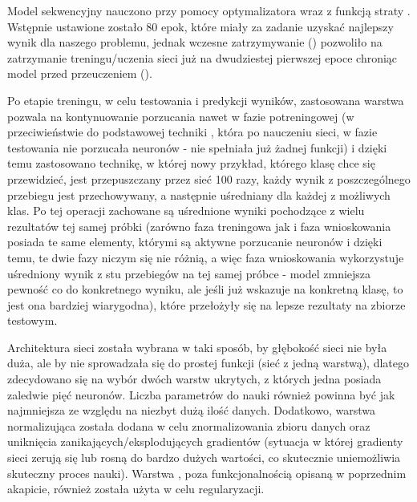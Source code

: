         Model sekwencyjny nauczono przy pomocy optymalizatora  \cite{adam} \cite{nadam} wraz z funkcją straty . Wstępnie ustawione zostało 80 epok, które miały za zadanie uzyskać najlepszy wynik dla naszego problemu, jednak wczesne zatrzymywanie () pozwoliło na zatrzymanie treningu/uczenia sieci już na dwudziestej pierwszej epoce chroniąc model przed przeuczeniem ().
        
        Po etapie treningu, w celu testowania i predykcji wyników, zastosowana warstwa  pozwala na kontynuowanie porzucania nawet w fazie potreningowej (w przeciwieństwie do podstawowej techniki , która po nauczeniu sieci, w fazie testowania nie porzucała neuronów - nie spełniała już żadnej funkcji) i dzięki temu zastosowano technikę, w której nowy przykład, którego klasę chce się przewidzieć, jest przepuszczany przez sieć 100 razy, każdy wynik z poszczególnego przebiegu jest przechowywany, a następnie uśredniany dla każdej z możliwych klas. Po tej operacji zachowane są uśrednione wyniki pochodzące z wielu rezultatów tej samej próbki (zarówno faza treningowa jak i faza wnioskowania posiada te same elementy, którymi są aktywne porzucanie neuronów i dzięki temu, te dwie fazy niczym się nie różnią, a więc faza wnioskowania wykorzystuje uśredniony wynik z stu przebiegów na tej samej próbce - model zmniejsza pewność co do konkretnego wyniku, ale jeśli już wskazuje na konkretną klasę, to jest ona bardziej wiarygodna), które przełożyły się na lepsze rezultaty na zbiorze testowym. 
        
        Architektura sieci została wybrana w taki sposób, by głębokość sieci nie była duża, ale by nie sprowadzała się do prostej funkcji (sieć z jedną warstwą), dlatego zdecydowano się na wybór dwóch warstw ukrytych, z których jedna posiada zaledwie pięć neuronów. Liczba parametrów do nauki również powinna być jak najmniejsza ze względu na niezbyt dużą ilość danych. Dodatkowo, warstwa normalizująca została dodana w celu znormalizowania zbioru danych oraz uniknięcia zanikających/eksplodujących gradientów (sytuacja w której gradienty sieci zerują się lub rosną do bardzo dużych wartości, co skutecznie uniemożliwia skuteczny proces nauki). Warstwa , poza funkcjonalnością opisaną w poprzednim akapicie, również została użyta w celu regularyzacji.
        
